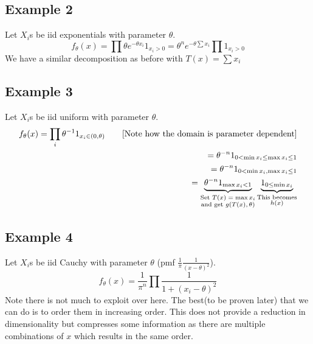 \documentclass[oneside]{book}
\begin{document}
\subsection{Example 2}
Let $X_i$s be iid exponentials with parameter $\theta$.
$$f_\theta(x)=\prod \theta e^{-\theta x_i}1_{x_i>0}=\theta^ne^{-\theta\sum x_i}\prod 1_{x_i>0}$$
We have a similar decomposition as before with $T(x)=\sum x_i$
\subsection{Example 3}
Let $X_i$s be iid uniform with parameter $\theta$.
\begin{align*}
    f_\theta(x)=\prod_{i}\theta^{-1}1_{x_i\in(0,\theta)}\tag*{\text{[Note how the domain is parameter dependent]}}\\
    =\theta^{-n}1_{0<\min x_i\leq \max x_i\leq 1}\\
    =\theta^{-n}1_{0<\min x_i,\max x_i\leq 1}\\
    =\underbrace{\theta^{-n}1_{\max x_i<1}}_
    {\substack{
        \text{Set $T(x)=\max x_i$}\\
        \text{and get $g(T(x),\theta)$}}}
   \underbrace{ 1_{0\leq \min x_i}}_
   {\substack{\text{This becomes}\\ h(x)}}
\end{align*}
\subsection{Example 4}
Let $X_i$s be iid Cauchy with parameter $\theta$ (pmf $\frac{1}{\pi}\frac{1}{(x-\theta)^2}$). 
$$f_\theta(x)=\frac{1}{\pi^n}\prod\frac{1}{1+(x_i-\theta)^2}$$
Note there is not much to exploit over here. The best(to be proven later) that we can do is to order them in increasing order. This does not provide a reduction in dimensionality but compresses some information as there are multiple combinations of $x$ which results in the same order. 
\end{document}

